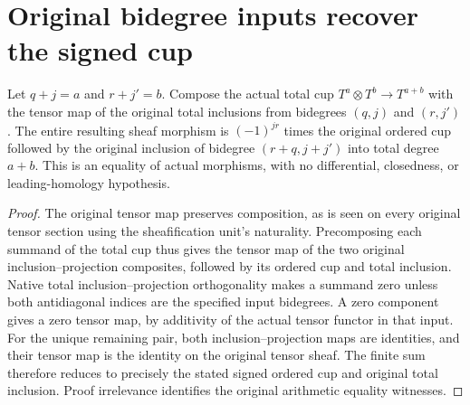 \section{Original bidegree inputs recover the signed cup}

\begin{theorem}
\label{thm:di-cech-total-cup-pure-input}
\leanok
{}
Let $q+j=a$ and $r+j'=b$. Compose the actual total cup
$T^a\otimes T^b\to T^{a+b}$ with the tensor map of the original total
inclusions from bidegrees $(q,j)$ and $(r,j')$. The entire resulting
sheaf morphism is $(-1)^{jr}$ times the original ordered cup followed
by the original inclusion of bidegree $(r+q,j+j')$ into total degree
$a+b$. This is an equality of actual morphisms, with no differential,
closedness, or leading-homology hypothesis.
\end{theorem}
\begin{proof}
The original tensor map preserves composition, as is seen on every
original tensor section using the sheafification unit's naturality.
Precomposing each summand of the total cup thus gives the tensor map
of the two original inclusion--projection composites, followed by its
ordered cup and total inclusion. Native total inclusion--projection
orthogonality makes a summand zero unless both antidiagonal indices
are the specified input bidegrees. A zero component gives a zero
tensor map, by additivity of the actual tensor functor in that input.
For the unique remaining pair, both inclusion--projection maps are
identities, and their tensor map is the identity on the original
tensor sheaf. The finite sum therefore reduces to precisely the
stated signed ordered cup and original total inclusion. Proof
irrelevance identifies the original arithmetic equality witnesses.
\end{proof}
